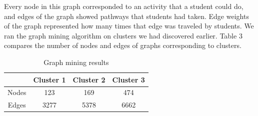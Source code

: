 \documentclass{edm_template}
\begin{document}
Every node in this graph corresponded to an activity that a student could do, and edges of the graph showed pathways that students had taken. Edge weights of the graph represented how many times that edge was traveled by students. We ran the graph mining algorithm on clusters we had discovered earlier. Table 3 compares the number of nodes and edges of graphs corresponding to clusters.

\begin{table}
\centering
\caption{Graph mining results}
\begin{tabular}{ c | c c c } \hline
                    & Cluster 1 & Cluster 2 & Cluster 3 \\ \hline
Nodes               & 123       & 169       & 474       \\
Edges               & 3277      & 5378      & 6662      \\
\hline \end{tabular}
\end{table}
\end{document}
